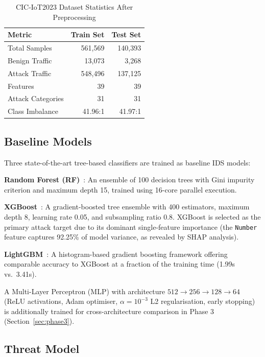 \documentclass[review,12pt]{elsarticle}
\begin{document}
\begin{table}[htbp]
\centering
\caption{CIC-IoT2023 Dataset Statistics After Preprocessing}
\label{tab:dataset}
\begin{tabular}{lrr}
\toprule
\textbf{Metric} & \textbf{Train Set} & \textbf{Test Set} \\
\midrule
Total Samples     & 561,569 & 140,393 \\
Benign Traffic    & 13,073  & 3,268   \\
Attack Traffic    & 548,496 & 137,125 \\
Features          & 39      & 39      \\
Attack Categories & 31      & 31      \\
Class Imbalance   & 41.96:1 & 41.97:1 \\
\bottomrule
\end{tabular}
\end{table}

\subsection{Baseline Models}

Three state-of-the-art tree-based classifiers are trained as baseline IDS models:

\textbf{Random Forest (RF)}~\cite{breiman2001random}: An ensemble of 100 decision trees with Gini impurity criterion and maximum depth 15, trained using 16-core parallel execution.

\textbf{XGBoost}~\cite{chen2016xgboost}: A gradient-boosted tree ensemble with 400 estimators, maximum depth 8, learning rate 0.05, and subsampling ratio 0.8. XGBoost is selected as the primary attack target due to its dominant single-feature importance (the \texttt{Number} feature captures 92.25\% of model variance, as revealed by SHAP analysis).

\textbf{LightGBM}~\cite{ke2017lightgbm}: A histogram-based gradient boosting framework offering comparable accuracy to XGBoost at a fraction of the training time (1.99s vs.\ 3.41s).

A Multi-Layer Perceptron (MLP) with architecture $512 \rightarrow 256 \rightarrow 128 \rightarrow 64$ (ReLU activations, Adam optimiser, $\alpha=10^{-3}$ L2 regularisation, early stopping) is additionally trained for cross-architecture comparison in Phase 3 (Section~\ref{sec:phase3}).

\subsection{Threat Model}
\label{sec:threat}
\end{document}

